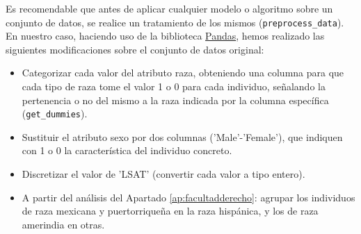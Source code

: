 \documentclass[oneside,openright,titlepage,numbers=noenddot,openany,headinclude,footinclude=true,
cleardoublepage=empty,abstractoff,BCOR=5mm,paper=a4,fontsize=12pt,main=spanish]{scrreprt}
\begin{document}
Es recomendable que antes de aplicar cualquier modelo o algoritmo sobre un conjunto de datos, se realice un tratamiento de los mismos (\texttt{preprocess\_data}). En nuestro caso, haciendo uso de la biblioteca \href{https://pandas.pydata.org/docs/}{Pandas}, hemos realizado las siguientes modificaciones sobre el conjunto de datos original:

\begin{itemize}
    \item Categorizar cada valor del atributo raza, obteniendo una columna para que cada tipo de raza tome el valor 1 o 0 para cada individuo, señalando la pertenencia o no del mismo a la raza indicada por la columna específica (\texttt{get\_dummies}).
    \item Sustituir el atributo sexo por dos columnas ('Male'-'Female'), que indiquen con 1 o 0 la característica del individuo concreto.
    \item Discretizar el valor de 'LSAT' (convertir cada valor a tipo entero).
    \item A partir del análisis del Apartado \ref{ap:facultadderecho}: agrupar los individuos de raza mexicana y puertorriqueña en la raza hispánica, y los de raza amerindia en otras.
\end{itemize}\
\end{document}
